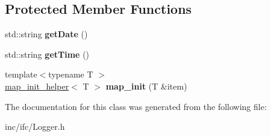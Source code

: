 \subsection*{Protected Member Functions}
\begin{DoxyCompactItemize}
\item 
\mbox{\label{classLogger_ac05df84a2b15ca6e1b3b6119a3b7a32c}} 
std\+::string {\bfseries get\+Date} ()
\item 
\mbox{\label{classLogger_af6e809c7f6fe8d2f829ce0d6a760e0ce}} 
std\+::string {\bfseries get\+Time} ()
\item 
\mbox{\label{classLogger_a8416f3e0b6fa98d42ca890c0577dff34}} 
{\footnotesize template$<$typename T $>$ }\\\hyperlink{structLogger_1_1map__init__helper}{map\+\_\+init\+\_\+helper}$<$ T $>$ {\bfseries map\+\_\+init} (T \&item)
\end{DoxyCompactItemize}


The documentation for this class was generated from the following file\+:\begin{DoxyCompactItemize}
\item 
inc/ifc/Logger.\+h\end{DoxyCompactItemize}

